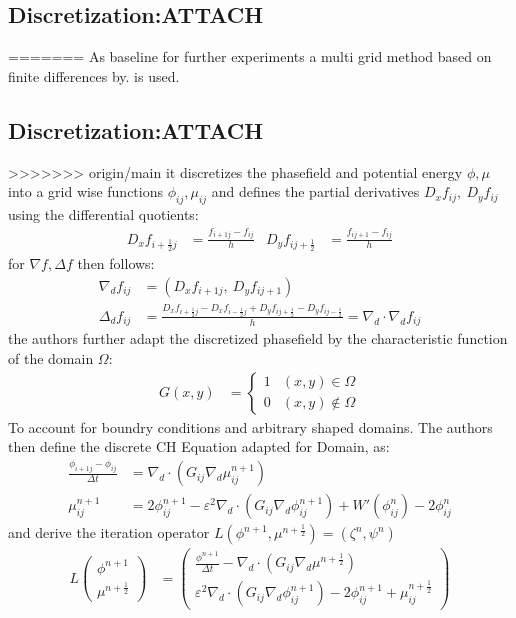 \documentclass[11pt]{article}
\begin{document}
\subsection{Discretization:\hfill{}\textsc{ATTACH}}
\label{sec:orgd8fd55b}
=======
\label{sec:org46fde8d}
As baseline for further experiments a multi grid method based on finite differences by\autocite{SHIN20117441}. is used.
\subsection{Discretization:\hfill{}\textsc{ATTACH}}
\label{sec:org6f425c3}
>>>>>>> origin/main
it discretizes the phasefield and potential energy \(\phi, \mu\) into a grid wise functions \(\phi_{ij}, \mu_{ij}\) and defines the partial derivatives \(D_xf_{ij}, \  D_yf_{ij}\) using the differential quotients:
\begin{align*}
D_xf_{i+\frac{1}{2} j} &= \frac{f_{i+1j} - f_{ij}}{h} & D_yf_{ij+\frac{1}{2}} &= \frac{f_{ij+1} - f_{ij}}{h}
\end{align*}
for \(\nabla f , \Delta f\) then follows:
\begin{align*}
\nabla_d f_{ij} &= (D_x f_{i+1j} , \ D_y f_{ij+1}) \\
 \Delta_d f_{ij} &= \frac{D_x f_{i+\frac{1}{2}j} -  D_x f_{i-\frac{1}{2}j} + D_y f_{ij+\frac{1}{2}} - D_y f_{ij-\frac{1}{2}}}{h} = \nabla_d \cdot  \nabla_d f_{ij}
\end{align*}
the authors further adapt the discretized phasefield by the characteristic function of the domain \(\Omega\):
\begin{align*}
G(x,y) &=
\begin{cases}
1 & (x,y) \in  \Omega \\
0 & (x,y) \not\in  \Omega
\end{cases}
\end{align*}
To account for boundry conditions and arbitrary shaped domains.
The authors \autocite{SHIN20117441} then define the discrete CH Equation adapted for Domain, as:
\begin{align*}
\frac{\phi_{i+1j} - \phi_{ij}}{\Delta t}  &=  \nabla _d \cdot (G_{ij} \nabla_d \mu_{ij}^{n+1} )  \\
 \mu_{ij}^{n+1} &= 2\phi_{ij}^{n+1} - \varepsilon^2  \nabla_d \cdot  (G_{ij} \nabla _d \phi_{ij}^{n+1} ) + W'(\phi_{ij}^n) - 2\phi _{ij}^n
\end{align*}
and derive the iteration operator \(L(\phi^{n+1} , \mu^{n+\frac{1}{2}}) = (\zeta^n ,\psi^n)\)
\begin{align*}
L
\begin{pmatrix}
\phi^{n+1} \\
\mu^{n+\frac{1}{2}}
\end{pmatrix}
&=
\begin{pmatrix}
\frac{\phi^{n+1}}{\Delta t} - \nabla _d \cdot  ( G_{ij} \nabla _d \mu^{n+\frac{1}{2}} ) \\
\varepsilon^2 \nabla _d \cdot  (G_{ij} \nabla_d \phi_{ij}^{n+1}) - 2\phi_{ij}^{n+1} + \mu_{ij}^{n+\frac{1}{2}}
\end{pmatrix}
\end{align*}
\end{document}
